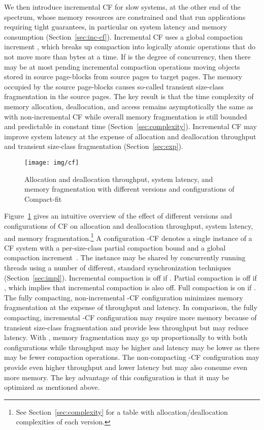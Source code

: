 \documentclass{amsart}
\begin{document}
We then introduce incremental CF for slow systems, at the other end of
the spectrum, whose memory resources are constrained and that run
applications requiring tight guarantees, in particular on system
latency and memory consumption (Section~\ref{sec:inc-cf}).
Incremental CF uses a global compaction increment , which
breaks up compaction into logically atomic operations that do not move
more than  bytes at a time.  If  is the degree of
concurrency, then there may be at most  pending incremental
compaction operations moving objects stored in  source page-blocks
from  source pages to  target pages.  The memory occupied by the
 source page-blocks causes so-called transient size-class
fragmentation in the  source pages.  The key result is that the
time complexity of memory allocation, deallocation, and access remains
asymptotically the same as with non-incremental CF while overall
memory fragmentation is still bounded and predictable in constant time
(Section~\ref{sec:complexity}).  Incremental CF may improve system
latency at the expense of allocation and deallocation throughput and
transient size-class fragmentation (Section~\ref{sec:exp}).

\begin{figure}
\begin{center}
\texttt{[image: img/cf]}
\caption{\label{fig:tradeoff}{Allocation and} deallocation throughput,
  system latency, and memory fragmentation with different versions and
  configurations of Compact-fit}
\end{center}
\end{figure}

Figure~\ref{fig:tradeoff} gives an intuitive overview of the effect of
different versions and configurations of CF on allocation and
deallocation throughput, system latency, and memory fragmentation.\footnote{{See Section~\ref{sec:complexity} for a table with allocation/deallocation complexities of each version.}}  A
configuration -CF denotes a single instance of a CF
system with a per-size-class partial compaction bound  and a
global compaction increment~.  The instance may be shared by
concurrently running threads using a number of different, standard
synchronization techniques (Section~\ref{sec:impl}).  Incremental
compaction is off if .  Partial compaction is off if
, which implies that incremental compaction is also
off.  Full compaction is on if .  The fully compacting,
non-incremental -CF configuration minimizes memory
fragmentation at the expense of throughput and latency.  In
comparison, the fully compacting, incremental -CF
configuration may require more memory because of transient size-class
fragmentation and provide less throughput but may reduce latency.
With , memory fragmentation may go up proportionally to
 with both configurations while throughput may be higher and
latency may be lower as there may be fewer compaction operations.  The
non-compacting -CF configuration may provide even
higher throughput and lower latency but may also consume even more
memory.  The key advantage of this configuration is that it may be
optimized as mentioned above.
\end{document}
